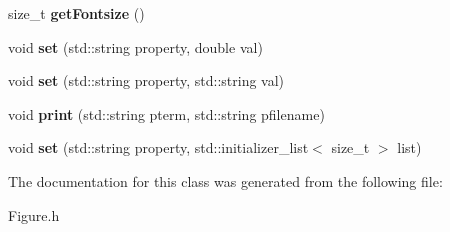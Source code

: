 \begin{DoxyCompactItemize}
\item 
\hypertarget{classkeycpp_1_1_figure_af808550cb627ddbd37fad174cfed2bef}{size\-\_\-t {\bfseries get\-Fontsize} ()}\label{classkeycpp_1_1_figure_af808550cb627ddbd37fad174cfed2bef}

\item 
\hypertarget{classkeycpp_1_1_figure_a7375fe8611759fda180d626f91eab510}{void {\bfseries set} (std\-::string property, double val)}\label{classkeycpp_1_1_figure_a7375fe8611759fda180d626f91eab510}

\item 
\hypertarget{classkeycpp_1_1_figure_a1f6c04d0276c0419c3feb974639fb7c2}{void {\bfseries set} (std\-::string property, std\-::string val)}\label{classkeycpp_1_1_figure_a1f6c04d0276c0419c3feb974639fb7c2}

\item 
\hypertarget{classkeycpp_1_1_figure_ac6d1881c6dc996eb508adf2126905d38}{void {\bfseries print} (std\-::string pterm, std\-::string pfilename)}\label{classkeycpp_1_1_figure_ac6d1881c6dc996eb508adf2126905d38}

\item 
\hypertarget{classkeycpp_1_1_figure_abceb69bfb4476f2c9423f248bc04a6c8}{void {\bfseries set} (std\-::string property, std\-::initializer\-\_\-list$<$ size\-\_\-t $>$ list)}\label{classkeycpp_1_1_figure_abceb69bfb4476f2c9423f248bc04a6c8}

\end{DoxyCompactItemize}


The documentation for this class was generated from the following file\-:\begin{DoxyCompactItemize}
\item 
Figure.\-h\end{DoxyCompactItemize}
